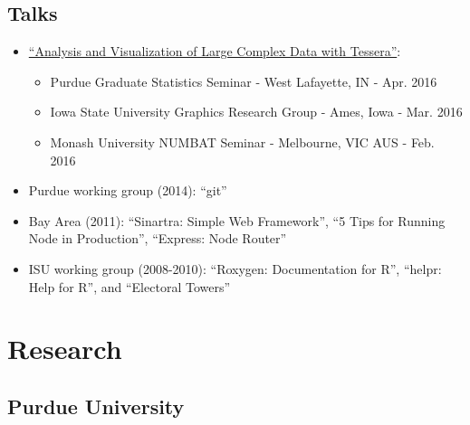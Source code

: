 \documentclass[oneside]{article}
\begin{document}
  \subsection{Talks}
    \begin{itemize}
    	\item \href{https://slides.com/schloerke/tessera-purdue-2016-4-7}{``Analysis and Visualization of Large Complex Data with Tessera''}:
		\begin{itemize}
			\item Purdue Graduate Statistics Seminar - West Lafayette, IN - Apr. 2016
			\item Iowa State University Graphics Research Group - Ames, Iowa - Mar. 2016
			\item Monash University NUMBAT Seminar - Melbourne, VIC AUS - Feb. 2016
		\end{itemize}


      \item Purdue working group (2014): ``git''
      \item Bay Area (2011): ``Sinartra: Simple Web Framework'', ``5 Tips for Running Node in Production'',
  ``Express: Node Router''
      \item ISU working group (2008-2010): ``Roxygen: Documentation for R'', ``helpr: Help for R'', and ``Electoral Towers''
    \end{itemize}


\section{Research}

\subsection{Purdue University}
\end{document}
